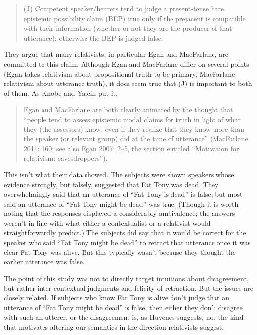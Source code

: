 \begin{quote}

(J) Competent speaker\slash hearers tend to judge a present-tense bare epistemic possibility claim (BEP) true only if the prejacent is compatible with their information (whether or not they are the producer of that utterance); otherwise the BEP is judged false.
\end{quote}
They argue that many relativists, in particular Egan and MacFarlane, are committed to this claim. Although Egan and MacFarlane differ on several points (Egan takes relativism about propositional truth to be primary, MacFarlane relativism about utterance truth), it does seem true that (J) is important to both of them. As Knobe and Yalcin put it,

\begin{quote}

Egan and MacFarlane are both clearly animated by the thought that ``people tend to assess epistemic modal claims for truth in light of what they (the assessors) know, even if they realize that they know more than the speaker (or relevant group) did at the time of utterance'' (MacFarlane 2011: 160; see also Egan 2007: 2–5, the section entitled ``Motivation for relativism: eavesdroppers''). ~\citep[3--4]{KnobeYalcin2014}
\end{quote}
This isn't what their data showed. The subjects were shown speakers whose evidence strongly, but falsely, suggested that Fat Tony was dead. They overwhelmingly said that an utterance of ``Fat Tony is dead'' is false, but most said an utterance of ``Fat Tony might be dead'' was true. (Though it is worth noting that the responses displayed a considerably ambivalence; the answers weren't in line with what either a contextualist or a relativist would straightforwardly predict.) The subjects did say that it would be correct for the speaker who said ``Fat Tony might be dead'' to retract that utterance once it was clear Fat Tony was alive. But this typically wasn't because they thought the earlier utterance was false.

The point of this study was not to directly target intuitions about disagreement, but rather inter-contextual judgments and felicity of retraction. But the issues are closely related. If subjects who know Fat Tony is alive don't judge that an utterance of ``Fat Tony might be dead'' is false, then either they don't disagree with such an utterer, or the disagreement is, as Huvenes suggests, not the kind that motivates altering our semantics in the direction relativists suggest.


